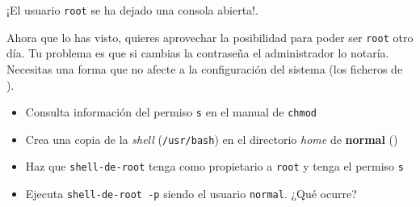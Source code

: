 \begin{homeworkProblem}


  \begin{multicols}{2}

    \null \vfill
    \begin{ActividadAdmin}
      ¡El usuario \texttt{root} se ha dejado una consola abierta!.

      Ahora que lo has visto, quieres aprovechar la posibilidad para poder ser \texttt{root} otro día. Tu problema es que si cambias la contraseña el administrador lo notaría. Necesitas una forma que no afecte a la configuración del sistema (los ficheros de ).
    \end{ActividadAdmin}
    \vfill \null
    \columnbreak



    \begin{ActividadHacker}
      \begin{itemize}
      \item Consulta información del permiso \texttt{s} en el manual de \texttt{chmod}
      \item Crea una copia de la \textit{shell} (\texttt{/usr/bash}) en el directorio \textit{home} de \textbf{normal} ()
      \item Haz que \texttt{shell-de-root} tenga como propietario a \texttt{root} y tenga el permiso \texttt{s}
      \item Ejecuta \texttt{shell-de-root -p} siendo el usuario \texttt{normal}. ¿Qué ocurre?
      \end{itemize}
    \end{ActividadHacker}

  \end{multicols}

  
\end{homeworkProblem}


